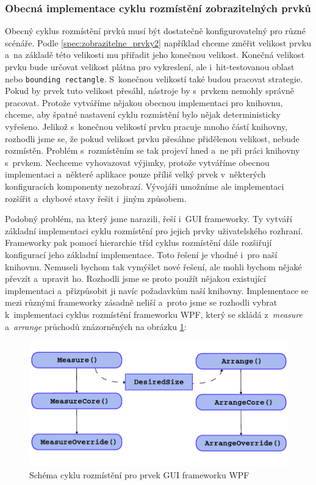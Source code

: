 \subsubsection*{Obecná implementace cyklu rozmístění zobrazitelných prvků}
Obecný cyklus rozmístění prvků musí být dostatečně konfigurovatelný pro různé scénáře. Podle \ref{spec:zobrazitelne_prvky2} například chceme změřit velikost prvku a~na základě této velikosti mu přiřadit jeho konečnou velikost. Konečná velikost prvku bude určovat velikost plátna pro vykreslení, ale i~hit-testovanou oblast nebo \texttt{bounding rectangle}. S~konečnou velikostí také budou pracovat strategie. Pokud by prvek tuto velikost přesáhl, nástroje by s~prvkem nemohly správně pracovat. Protože vytváříme nějakou obecnou implementaci pro knihovnu, chceme, aby špatné nastavení cyklu rozmístění bylo nějak deterministicky vyřešeno. Jelikož s~konečnou velikostí prvku pracuje mnoho částí knihovny, rozhodli jsme se, že pokud velikost prvku přesáhne přidělenou velikost, nebude rozmístěn. Problém s~rozmístěním se tak projeví hned a~ne při práci knihovny s~prvkem. Nechceme vyhovazovat výjimky, protože vytváříme obecnou implementaci a~některé aplikace pouze příliš velký prvek v~některých konfiguracích komponenty nezobrazí. Vývojáři umožníme ale implementaci rozšířit a~chybové stavy řešit i~jiným způsobem.

Podobný problém, na který jsme narazili, řeší i~GUI frameworky. Ty vytváří základní implementaci cyklu rozmístění pro jejich prvky uživatelského rozhraní. Frameworky pak pomocí hierarchie tříd cyklus rozmístění dále rozšiřují konfigurací jeho základní implementace. Toto řešení je vhodné i~pro naší knihovnu. Nemuseli bychom tak vymýšlet nové řešení, ale mohli bychom nějaké převzít a~upravit ho. Rozhodli jsme se proto použít nějakou existující implementaci a~přizpůsobit ji navíc požadavkům naší knihovny. Implementace se mezi různými frameworky zásadně neliší a~proto jsme se rozhodli vybrat k~implementaci cyklus rozmístění frameworku WPF, který se skládá z~\textit{measure} a~\textit{arrange} průchodů znázorněných na obrázku \ref{fig:arrange_WPF}:

\begin{figure}[!bht]
	\centering
	\includegraphics[width=\textwidth]{../img/kap3_wpf_element_layout_cycle_diagram}
	\caption{Schéma cyklu rozmístění pro prvek GUI frameworku WPF}
	\label{fig:arrange_WPF}
\end{figure}

